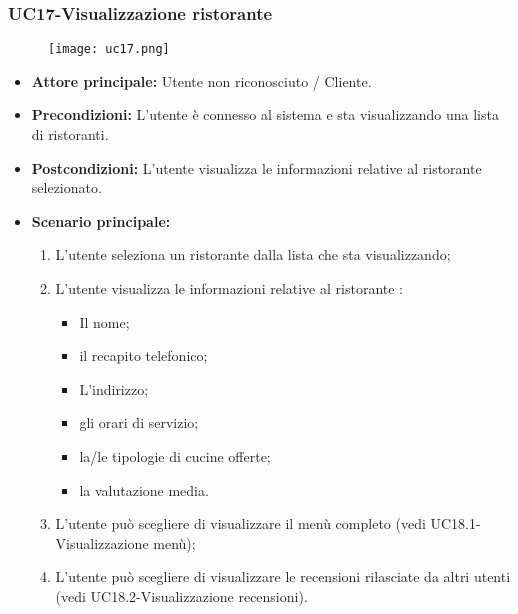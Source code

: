 \subsubsection{UC17-Visualizzazione ristorante}
\begin{figure}[h] \texttt{[image: uc17.png]} \end{figure}
\begin{itemize}
\item \textbf{Attore principale:} Utente non riconosciuto / Cliente.
\item \textbf{Precondizioni:} L'utente è connesso al sistema e sta visualizzando una lista di ristoranti.
\item \textbf{Postcondizioni:} L'utente visualizza le informazioni relative al ristorante selezionato.
\item \textbf{Scenario principale:}
\begin{enumerate}
    \item L'utente seleziona un ristorante dalla lista che sta visualizzando;
    \item L'utente visualizza le informazioni relative al ristorante :
    \begin{itemize}
        \item Il nome;
        \item il recapito telefonico;
        \item L'indirizzo;
        \item gli orari di servizio;
        \item la/le tipologie di cucine offerte;
        \item la valutazione media.
    \end{itemize}
    \item L'utente può scegliere di visualizzare il menù completo (vedi UC18.1-Visualizzazione menù);
    \item L'utente può scegliere di visualizzare le recensioni rilasciate da altri utenti (vedi UC18.2-Visualizzazione recensioni).
\end{enumerate}
\end{itemize}

